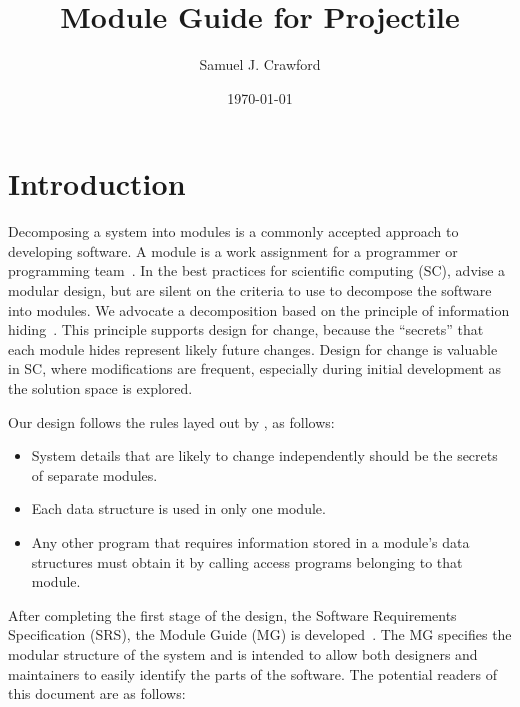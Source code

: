 \documentclass[12pt]{article}
\begin{document}
\title{Module Guide for Projectile} 
\author{Samuel J. Crawford}
\date{\today}
	
\maketitle

\tableofcontents

\newpage

\section{Introduction}

Decomposing a system into modules is a commonly accepted approach to developing
software.  A module is a work assignment for a programmer or programming
team~\citep{ParnasEtAl1984}.  In the best practices for scientific computing (SC),
\citet{WilsonEtAl2013} advise a modular design, but are silent on the criteria
to use to decompose the software into modules.  We advocate a decomposition
based on the principle of information hiding~\citep{Parnas1972a}.  This
principle supports design for change, because the ``secrets'' that each module
hides represent likely future changes.  Design for change is valuable in SC,
where modifications are frequent, especially during initial development as the
solution space is explored.  

Our design follows the rules layed out by \citet{ParnasEtAl1984}, as follows:
\begin{itemize}
\item System details that are likely to change independently should be the
  secrets of separate modules.
\item Each data structure is used in only one module.
\item Any other program that requires information stored in a module's data
  structures must obtain it by calling access programs belonging to that module.
\end{itemize}

After completing the first stage of the design, the Software Requirements
Specification (SRS), the Module Guide (MG) is developed~\citep{ParnasEtAl1984}. The MG
specifies the modular structure of the system and is intended to allow both
designers and maintainers to easily identify the parts of the software.  The
potential readers of this document are as follows:
\end{document}
